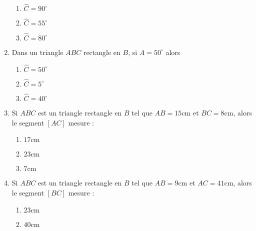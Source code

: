 \documentclass[oneside,twoside]{book}
\begin{document}
\begin{enumerate}
\begin{enumerate}
\item\MauvaiseReponse $\widehat{C}=90^{\circ}$

\item\MauvaiseReponse $\widehat{C}=55^{\circ}$

\item\BonneReponse $\widehat{C}=80^{\circ}$

\end{enumerate}


\item Dans un triangle $ABC$ rectangle en $B$, si $\widehat{A}=50^{\circ}$ alors

\begin{enumerate}

\item\MauvaiseReponse $\widehat{C}=50^{\circ}$

\item\MauvaiseReponse $\widehat{C}=5^{\circ}$

\item\BonneReponse $\widehat{C}=40^{\circ}$

\end{enumerate}



\item Si $ABC$ est un triangle rectangle en $B$ tel que $AB=15\mathrm{cm}$ et $BC=8\mathrm{cm}$, alors le segment $\left[AC\right]$ mesure :

\begin{enumerate}

\item\BonneReponse $17\mathrm{cm}$

\item\MauvaiseReponse $23\mathrm{cm}$

\item\MauvaiseReponse $7\mathrm{cm}$

\end{enumerate}



\item Si $ABC$ est un triangle rectangle en $B$ tel que $AB=9\mathrm{cm}$ et $AC=41\mathrm{cm}$, alors le segment $\left[BC\right]$ mesure :

\begin{enumerate}


\item\MauvaiseReponse $23\mathrm{cm}$

\item\BonneReponse $40\mathrm{cm}$


\end{enumerate}
\end{enumerate}
\end{document}
